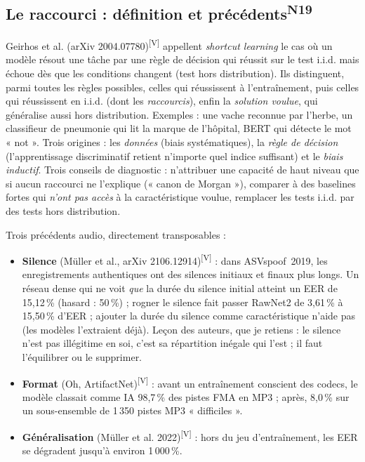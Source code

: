 \documentclass[10pt,a4paper]{article}
\newcommand{\sV}{\textsuperscript{\scriptsize\textcolor{green!40!black}{[V]}}}
\newcommand{\nref}[1]{\textsuperscript{\scriptsize\textcolor{black!55}{#1}}}
\begin{document}
\subsection{Le raccourci : définition et précédents\nref{N19}}
Geirhos et al. (arXiv 2004.07780)\sV{} appellent \emph{shortcut learning} le cas où un modèle résout une tâche par une règle de décision qui réussit sur le test i.i.d. mais échoue dès que les conditions changent (test hors distribution). Ils distinguent, parmi toutes les règles possibles, celles qui réussissent à l'entraînement, puis celles qui réussissent en i.i.d. (dont les \emph{raccourcis}), enfin la \emph{solution voulue}, qui généralise aussi hors distribution. Exemples : une vache reconnue par l'herbe, un classifieur de pneumonie qui lit la marque de l'hôpital, BERT qui détecte le mot « not ». Trois origines : les \emph{données} (biais systématiques), la \emph{règle de décision} (l'apprentissage discriminatif retient n'importe quel indice suffisant) et le \emph{biais inductif}. Trois conseils de diagnostic : n'attribuer une capacité de haut niveau que si aucun raccourci ne l'explique (« canon de Morgan »), comparer à des baselines fortes qui \emph{n'ont pas accès} à la caractéristique voulue, remplacer les tests i.i.d. par des tests hors distribution.

Trois précédents audio, directement transposables :
\begin{itemize}
  \item \textbf{Silence} (Müller et al., arXiv 2106.12914)\sV{} : dans ASVspoof~2019, les enregistrements authentiques ont des silences initiaux et finaux plus longs. Un réseau dense qui ne voit \emph{que} la durée du silence initial atteint un EER de 15,12\,\% (hasard : 50\,\%) ; rogner le silence fait passer RawNet2 de 3,61\,\% à 15,50\,\% d'EER ; ajouter la durée du silence comme caractéristique n'aide pas (les modèles l'extraient déjà). Leçon des auteurs, que je retiens : le silence n'est pas illégitime en soi, c'est sa répartition inégale qui l'est ; il faut l'équilibrer ou le supprimer.
  \item \textbf{Format} (Oh, ArtifactNet)\sV{} : avant un entraînement conscient des codecs, le modèle classait comme IA 98,7\,\% des pistes FMA en MP3 ; après, 8,0\,\% sur un sous-ensemble de 1\,350 pistes MP3 « difficiles ».
  \item \textbf{Généralisation} (Müller et al. 2022)\sV{} : hors du jeu d'entraînement, les EER se dégradent jusqu'à environ 1\,000\,\%.
\end{itemize}
\end{document}
